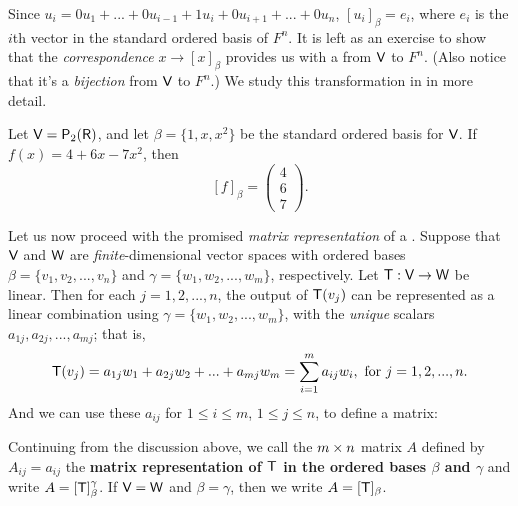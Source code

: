 \begin{note}
Since \(u_i = 0 u_1 + ... + 0 u_{i - 1} + 1 u_i + 0 u_{i + 1} + ... + 0 u_n\), \([u_i]_{\beta} = e_i\), where \(e_i\) is the \(i\)th vector in the standard ordered basis of \(F^{n}\).
It is left as an exercise to show that the \emph{correspondence} \(x \to [x]_{\beta}\) provides us with a \LTRAN{} from \(\textsf{V}\) to \(F^n\).
(Also notice that it's a \emph{bijection} from \(\textsf{V}\) to \(F^n\).)
We study this transformation in  in more
detail.
\end{note}

\begin{example} \label{example 2.2.2}
Let \(\textsf{V} = \textsf{P}_2(\textsf{R})\), and let \(\beta = \{ 1, x , x^2 \}\) be the standard ordered basis for \(\textsf{V}\).
If \(f(x) = 4 + 6x - 7x^2\), then
\[
    [f]_{\beta} = \begin{pmatrix} 4 \\ 6 \\ 7 \end{pmatrix}.
\]
\end{example}

Let us now proceed with the promised \emph{matrix representation} of a \LTRAN{}.
Suppose that \(\textsf{V}\) and \(\textsf{W}\) are \emph{finite}-dimensional vector spaces with ordered bases \(\beta = \{ v_1, v_2, ..., v_n \}\) and \(\gamma = \{ w_1, w_2, ..., w_m \}\), respectively.
Let \(\textsf{T} : \textsf{V} \to \textsf{W}\) be linear.
Then for each \(j = 1, 2, ..., n\), the output of \(\textsf{T}(v_j)\) can be represented as a linear combination using \(\gamma = \{ w_1, w_2, ..., w_m \}\), with the \emph{unique} scalars \(a_{1j}, a_{2j}, ..., a_{mj}\);
that is,
\[
    \textsf{T}(v_j) = a_{1j} w_1 + a_{2j} w_2 + ... + a_{mj} w_m = \sum_{i = 1}^m a_{ij} w_i, \text{ for } j = 1, 2, ..., n.
\]
And we can use these \(a_{ij}\) for \(1 \le i \le m\), \(1 \le j \le n\), to define a matrix:

\begin{definition} \label{def 2.6}
Continuing from the discussion above, we call the \(m \times n\) matrix \(A\) defined by \(A_{ij} = a_{ij}\) the \textbf{matrix representation of \(\textsf{T}\) in the ordered bases \(\beta\)
and \(\gamma\)} and write \(A = [\textsf{T}]_{\beta}^{\gamma}\).
If \(\textsf{V} = \textsf{W}\) and \(\beta = \gamma\), then we write \(A = [\textsf{T}]_{\beta}\).
\end{definition}

